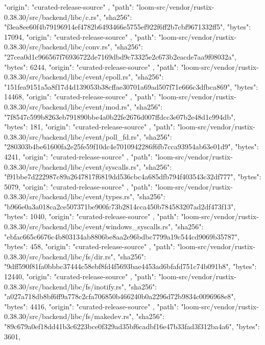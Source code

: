 {{      "origin": "curated-release-source"
    },
    {
      "path": "loom-src/vendor/rustix-0.38.30/src/backend/libc/c.rs",
      "sha256": "f3ea8ee60f4b79196914ef4782b6493466e5755ef922f6ff2b7cbf9671332ff5",
      "bytes": 17094,
      "origin": "curated-release-source"
    },
    {
      "path": "loom-src/vendor/rustix-0.38.30/src/backend/libc/conv.rs",
      "sha256": "27cea0d1c966567f76936722de7169dbd9c73325e2c673b2eacde7aa9f08032a",
      "bytes": 6244,
      "origin": "curated-release-source"
    },
    {
      "path": "loom-src/vendor/rustix-0.38.30/src/backend/libc/event/epoll.rs",
      "sha256": "151fea9151a5a8f17d4d139053b38cffae30701a69ad507f71e666c3dfbca869",
      "bytes": 14468,
      "origin": "curated-release-source"
    },
    {
      "path": "loom-src/vendor/rustix-0.38.30/src/backend/libc/event/mod.rs",
      "sha256": "7f8547c599b8263eb791890bbe4a0b22fe2676d007ffdcc3e07b2e48d1c994db",
      "bytes": 181,
      "origin": "curated-release-source"
    },
    {
      "path": "loom-src/vendor/rustix-0.38.30/src/backend/libc/event/poll_fd.rs",
      "sha256": "280303b4be61600fa2e25fe59f10dc4e7010942286f6fb7cca93954ab63e01d9",
      "bytes": 4241,
      "origin": "curated-release-source"
    },
    {
      "path": "loom-src/vendor/rustix-0.38.30/src/backend/libc/event/syscalls.rs",
      "sha256": "f91bbe7d222987c89a2647817f6819dd536cbc4a685dfb794f403543c32df777",
      "bytes": 5079,
      "origin": "curated-release-source"
    },
    {
      "path": "loom-src/vendor/rustix-0.38.30/src/backend/libc/event/types.rs",
      "sha256": "b966e0a3a018ca2ce507371be900fc73b2814cca450b784583207ad2df473f13",
      "bytes": 1040,
      "origin": "curated-release-source"
    },
    {
      "path": "loom-src/vendor/rustix-0.38.30/src/backend/libc/event/windows_syscalls.rs",
      "sha256": "ebfac665c6676c4b803134ab8806be8aa2e96bdbc7799a19c544cd9069b35787",
      "bytes": 458,
      "origin": "curated-release-source"
    },
    {
      "path": "loom-src/vendor/rustix-0.38.30/src/backend/libc/fs/dir.rs",
      "sha256": "9dff590f81fa0bbbc37444c58ebf8fd4f5693bae4453ad6bfafd751c74b091b8",
      "bytes": 12440,
      "origin": "curated-release-source"
    },
    {
      "path": "loom-src/vendor/rustix-0.38.30/src/backend/libc/fs/inotify.rs",
      "sha256": "a027a718db8bf6ff9a778c2cfa706850b466240b0a2296d72b9834c0096968e8",
      "bytes": 4416,
      "origin": "curated-release-source"
    },
    {
      "path": "loom-src/vendor/rustix-0.38.30/src/backend/libc/fs/makedev.rs",
      "sha256": "89c679a0ef18dd41b3c6223bce0f329ad35bf6cadbf16e47b33fad3f312ba4a6",
      "bytes": 3601,
}}
